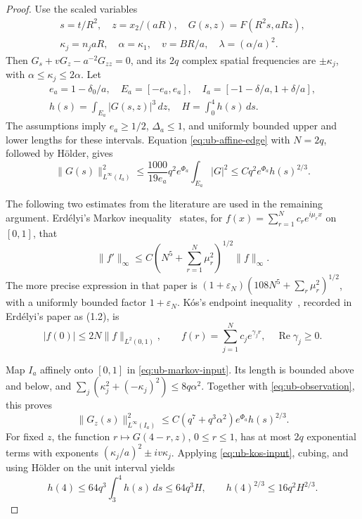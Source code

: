 \begin{proof}
Use the scaled variables
\[
 \begin{gathered}
 s=t/R^2,\quad z=x_2/(aR),\quad G(s,z)=F(R^2s,aRz),\\
 \kappa_j=n_jaR,\quad \alpha=\kappa_1,\quad
 v=BR/a,\quad\lambda=(\alpha/a)^2.
 \end{gathered}
\]
Then $G_s+vG_z-a^{-2}G_{zz}=0$, and its $2q$ complex spatial
frequencies are $\pm\kappa_j$, with $\alpha\le\kappa_j\le2\alpha$.
Let
\[
 \begin{gathered}
 e_a=1-\delta_0/a,\quad E_a=[-e_a,e_a],\quad
 I_a=[-1-\delta/a,1+\delta/a],\\
 h(s)=\int_{E_a}|G(s,z)|^3\,dz,\quad H=\int_0^4h(s)\,ds.
 \end{gathered}
\]
The assumptions imply $e_a\ge1/2$, $\Delta_a\le1$, and uniformly
bounded upper and lower lengths for these intervals.
Equation \eqref{eq:ub-affine-edge} with $N=2q$, followed by H\"older,
gives
\begin{equation}\label{eq:ub-observation}
 \|G(s)\|_{L^\infty(I_a)}^2
 \le\frac{1000}{19e_a}q^2e^{\Phi_a}\int_{E_a}|G|^2
 \le Cq^2e^{\Phi_a}h(s)^{2/3}.
\end{equation}

The following two estimates from the literature are used in the remaining
argument.  Erd\'elyi's Markov inequality~\cite{Erdelyi2017} states, for
$f(x)=\sum_{r=1}^N c_re^{i\mu_rx}$ on $[0,1]$, that
\begin{equation}\label{eq:ub-markov-input}
 \|f'\|_\infty\le C
       \left(N^5+\sum_{r=1}^N\mu_r^2\right)^{1/2}\|f\|_\infty.
\end{equation}
The more precise expression in that paper is
$(1+\varepsilon_N)(108N^5+\sum_r\mu_r^2)^{1/2}$, with a uniformly
bounded factor $1+\varepsilon_N$.
K\'os's endpoint inequality~\cite{Kos2008}, recorded in
Erd\'elyi's paper as (1.2), is
\begin{equation}\label{eq:ub-kos-input}
 |f(0)|\le2N\|f\|_{L^2(0,1)},\qquad
 f(r)=\sum_{j=1}^N c_je^{\gamma_jr},\quad
 \operatorname{Re}\gamma_j\ge0.
\end{equation}

Map $I_a$ affinely onto $[0,1]$ in
\eqref{eq:ub-markov-input}.  Its length is bounded above and below,
and $\sum_j(\kappa_j^2+(-\kappa_j)^2)\le8q\alpha^2$.
Together with \eqref{eq:ub-observation}, this proves
\begin{equation}\label{eq:ub-derivative}
 \|G_z(s)\|_{L^\infty(I_a)}^2
 \le C(q^7+q^3\alpha^2)e^{\Phi_a}h(s)^{2/3}.
\end{equation}
For fixed $z$, the function $r\mapsto G(4-r,z)$, $0\le r\le1$,
has at most $2q$ exponential terms with exponents
$(\kappa_j/a)^2\pm iv\kappa_j$.  Applying
\eqref{eq:ub-kos-input}, cubing, and using H\"older on the unit
interval yields
\begin{equation}\label{eq:ub-endpoint}
 h(4)\le64q^3\int_3^4h(s)\,ds\le64q^3H,
 \qquad h(4)^{2/3}\le16q^2H^{2/3}.
\end{equation}


\end{proof}
